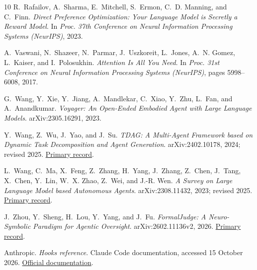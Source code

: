 \documentclass[11pt,a4paper]{article}
\begin{document}
\begin{thebibliography}{10}
R.~Rafailov, A.~Sharma, E.~Mitchell, S.~Ermon, C.~D. Manning, and C.~Finn.
\newblock \emph{Direct Preference Optimization: Your Language Model is Secretly a Reward Model}.
\newblock In \emph{Proc. 37th Conference on Neural Information Processing Systems (NeurIPS)}, 2023.

A.~Vaswani, N.~Shazeer, N.~Parmar, J.~Uszkoreit, L.~Jones, A.~N. Gomez, L.~Kaiser, and I.~Polosukhin.
\newblock \emph{Attention Is All You Need}.
\newblock In \emph{Proc. 31st Conference on Neural Information Processing Systems (NeurIPS)}, pages 5998--6008, 2017.

G.~Wang, Y.~Xie, Y.~Jiang, A.~Mandlekar, C.~Xiao, Y.~Zhu, L.~Fan, and A.~Anandkumar.
\newblock \emph{Voyager: An Open-Ended Embodied Agent with Large Language Models}.
\newblock arXiv:2305.16291, 2023.

Y.~Wang, Z.~Wu, J.~Yao, and J.~Su.
\newblock \emph{TDAG: A Multi-Agent Framework based on Dynamic Task Decomposition and Agent Generation}.
\newblock arXiv:2402.10178, 2024; revised 2025.
\newblock \href{https://arxiv.org/abs/2402.10178v2}{Primary record}.

L.~Wang, C.~Ma, X.~Feng, Z.~Zhang, H.~Yang, J.~Zhang, Z.~Chen, J.~Tang, X.~Chen, Y.~Lin, W.~X. Zhao, Z.~Wei, and J.-R. Wen.
\newblock \emph{A Survey on Large Language Model based Autonomous Agents}.
\newblock arXiv:2308.11432, 2023; revised 2025.
\newblock \href{https://arxiv.org/abs/2308.11432v7}{Primary record}.

J.~Zhou, Y.~Sheng, H.~Lou, Y.~Yang, and J.~Fu.
\newblock \emph{FormalJudge: A Neuro-Symbolic Paradigm for Agentic Oversight}.
\newblock arXiv:2602.11136v2, 2026.
\newblock \href{https://arxiv.org/abs/2602.11136v2}{Primary record}.

Anthropic. \newblock \emph{Hooks reference}. \newblock Claude Code documentation, accessed 15 October 2026. \newblock \href{https://code.claude.com/docs/en/hooks}{Official documentation}.

\end{thebibliography}
\end{document}
